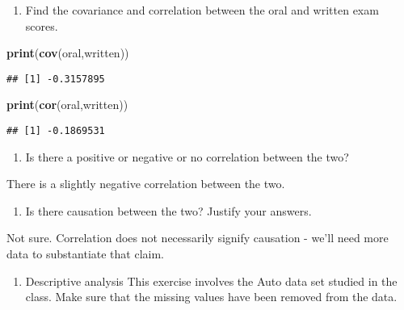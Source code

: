 \documentclass[]{article}
\newenvironment{Shaded}{\begin{snugshade}}{\end{snugshade}}
\newcommand{\KeywordTok}[1]{\textcolor[rgb]{0.13,0.29,0.53}{\textbf{#1}}}
\newcommand{\NormalTok}[1]{#1}
\providecommand{\tightlist}{%
  \setlength{\itemsep}{0pt}\setlength{\parskip}{0pt}}
\begin{document}
\begin{enumerate}
\def\labelenumi{(\alph{enumi})}
\setcounter{enumi}{1}
\tightlist
\item
  Find the covariance and correlation between the oral and written exam
  scores.
\end{enumerate}

\begin{Shaded}
\begin{Highlighting}[]
\KeywordTok{print}\NormalTok{(}\KeywordTok{cov}\NormalTok{(oral,written))}
\end{Highlighting}
\end{Shaded}

\begin{verbatim}
## [1] -0.3157895
\end{verbatim}

\begin{Shaded}
\begin{Highlighting}[]
\KeywordTok{print}\NormalTok{(}\KeywordTok{cor}\NormalTok{(oral,written))}
\end{Highlighting}
\end{Shaded}

\begin{verbatim}
## [1] -0.1869531
\end{verbatim}

\begin{enumerate}
\def\labelenumi{(\alph{enumi})}
\setcounter{enumi}{2}
\tightlist
\item
  Is there a positive or negative or no correlation between the two?
\end{enumerate}

There is a slightly negative correlation between the two.

\begin{enumerate}
\def\labelenumi{(\alph{enumi})}
\setcounter{enumi}{3}
\tightlist
\item
  Is there causation between the two? Justify your answers.
\end{enumerate}

Not sure. Correlation does not necessarily signify causation - we'll
need more data to substantiate that claim.

\begin{enumerate}
\def\labelenumi{\arabic{enumi}.}
\setcounter{enumi}{2}
\tightlist
\item
  Descriptive analysis This exercise involves the Auto data set studied
  in the class. Make sure that the missing values have been removed from
  the data.
\end{enumerate}
\end{document}
